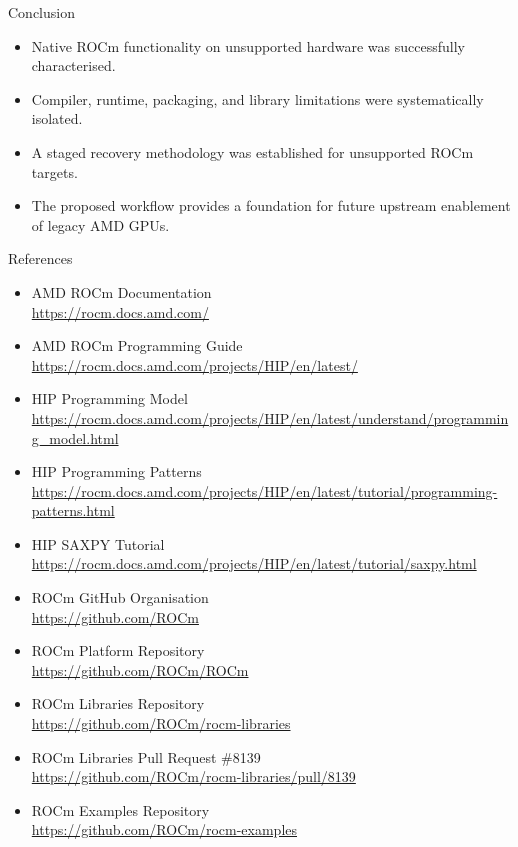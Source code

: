 \documentclass[aspectratio=43,9pt]{beamer}
\begin{document}
\begin{frame}{Conclusion}
\vspace{-0.5cm}
\begin{itemize}
    \item Native ROCm functionality on unsupported hardware was successfully characterised.
    \item Compiler, runtime, packaging, and library limitations were systematically isolated.
    \item A staged recovery methodology was established for unsupported ROCm targets.
    \item The proposed workflow provides a foundation for future upstream enablement of legacy AMD GPUs.
\end{itemize}
\end{frame}


\begin{frame}{References}
\scriptsize
\begin{itemize}
    \item AMD ROCm Documentation\\
    \url{https://rocm.docs.amd.com/}

    \item AMD ROCm Programming Guide\\
    \url{https://rocm.docs.amd.com/projects/HIP/en/latest/}

    \item HIP Programming Model\\
    \url{https://rocm.docs.amd.com/projects/HIP/en/latest/understand/programming_model.html}

    \item HIP Programming Patterns\\
    \url{https://rocm.docs.amd.com/projects/HIP/en/latest/tutorial/programming-patterns.html}

    \item HIP SAXPY Tutorial\\
    \url{https://rocm.docs.amd.com/projects/HIP/en/latest/tutorial/saxpy.html}

    \item ROCm GitHub Organisation\\
    \url{https://github.com/ROCm}

    \item ROCm Platform Repository\\
    \url{https://github.com/ROCm/ROCm}

    \item ROCm Libraries Repository\\
    \url{https://github.com/ROCm/rocm-libraries}

    \item ROCm Libraries Pull Request \#8139\\
    \url{https://github.com/ROCm/rocm-libraries/pull/8139}

    \item ROCm Examples Repository\\
    \url{https://github.com/ROCm/rocm-examples}

    
\end{itemize}
\end{frame}
\end{document}
